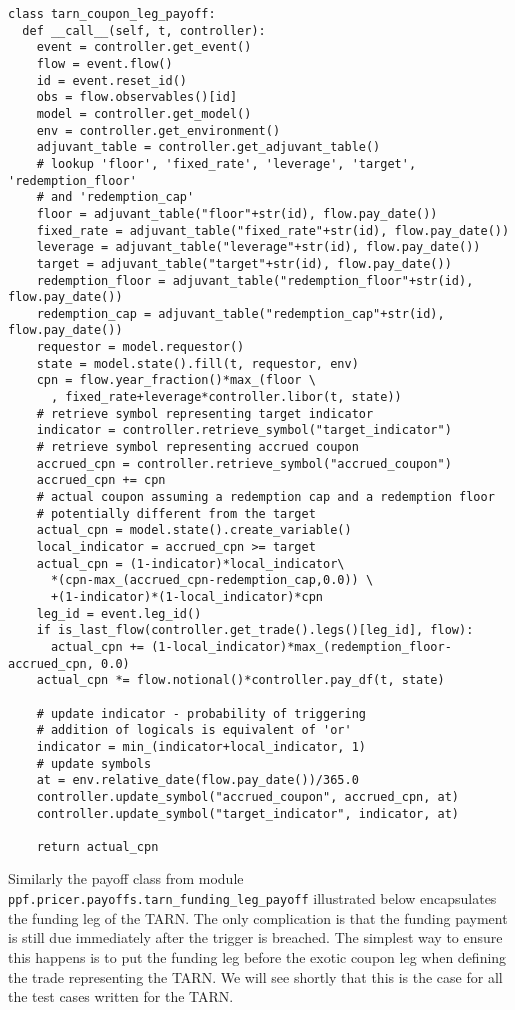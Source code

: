 \begin{verbatim}
class tarn_coupon_leg_payoff:
  def __call__(self, t, controller):    
    event = controller.get_event() 
    flow = event.flow()
    id = event.reset_id()
    obs = flow.observables()[id]
    model = controller.get_model()
    env = controller.get_environment()
    adjuvant_table = controller.get_adjuvant_table()
    # lookup 'floor', 'fixed_rate', 'leverage', 'target', 'redemption_floor'
    # and 'redemption_cap'
    floor = adjuvant_table("floor"+str(id), flow.pay_date())
    fixed_rate = adjuvant_table("fixed_rate"+str(id), flow.pay_date())
    leverage = adjuvant_table("leverage"+str(id), flow.pay_date())
    target = adjuvant_table("target"+str(id), flow.pay_date())
    redemption_floor = adjuvant_table("redemption_floor"+str(id), flow.pay_date())
    redemption_cap = adjuvant_table("redemption_cap"+str(id), flow.pay_date())
    requestor = model.requestor()
    state = model.state().fill(t, requestor, env)
    cpn = flow.year_fraction()*max_(floor \
      , fixed_rate+leverage*controller.libor(t, state))
    # retrieve symbol representing target indicator 
    indicator = controller.retrieve_symbol("target_indicator")
    # retrieve symbol representing accrued coupon 
    accrued_cpn = controller.retrieve_symbol("accrued_coupon")
    accrued_cpn += cpn
    # actual coupon assuming a redemption cap and a redemption floor 
    # potentially different from the target
    actual_cpn = model.state().create_variable()
    local_indicator = accrued_cpn >= target
    actual_cpn = (1-indicator)*local_indicator\
      *(cpn-max_(accrued_cpn-redemption_cap,0.0)) \
      +(1-indicator)*(1-local_indicator)*cpn
    leg_id = event.leg_id()
    if is_last_flow(controller.get_trade().legs()[leg_id], flow): 
      actual_cpn += (1-local_indicator)*max_(redemption_floor-accrued_cpn, 0.0)
    actual_cpn *= flow.notional()*controller.pay_df(t, state)

    # update indicator - probability of triggering
    # addition of logicals is equivalent of 'or'
    indicator = min_(indicator+local_indicator, 1)  
    # update symbols
    at = env.relative_date(flow.pay_date())/365.0
    controller.update_symbol("accrued_coupon", accrued_cpn, at)
    controller.update_symbol("target_indicator", indicator, at)

    return actual_cpn
\end{verbatim}

Similarly the payoff class from module \verb|ppf.pricer.payoffs.tarn_funding_leg_payoff| illustrated below encapsulates the funding leg of the TARN. The only complication is that the funding payment is still due immediately after the trigger is breached. The simplest way to ensure this happens is to put the funding leg before the exotic coupon leg when defining the trade representing the TARN. We will see shortly that this is the case for all the test cases written for the TARN. 

